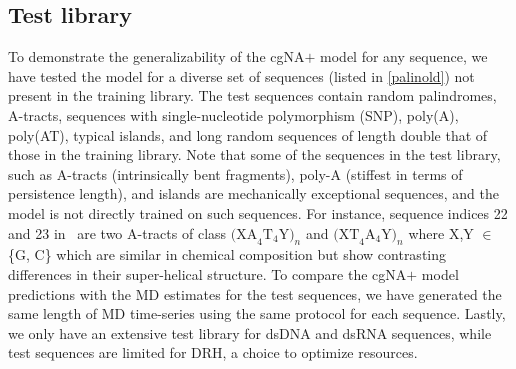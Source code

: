 \subsection{Test library}
To demonstrate the generalizability of the cgNA$+$ model for any sequence, we have tested the model for a diverse set of sequences (listed in \cref{palinold}) not present in the training library. 
The test sequences contain random palindromes, A-tracts, sequences with single-nucleotide polymorphism (SNP), poly(A), poly(AT), typical \cpg islands, and long random sequences of length double that of those in the training library.
Note that some of the sequences in the test library, such as A-tracts (intrinsically bent fragments), poly-A (stiffest in terms of persistence length), and \cpg islands are mechanically exceptional sequences, and the model is not directly trained on such sequences.
For instance, sequence indices 22 and 23 in \Lbdna \ are two A-tracts of class $\text{(XA}_4\text{T}_4\text{Y)}_n$ and $\text{(XT}_4\text{A}_4\text{Y)}_n$ where X,Y $\in$ \{G, C\} which are similar in chemical composition but show contrasting differences in their super-helical structure.
To compare the cgNA$+$ model predictions with the MD estimates for the test sequences, we have generated the same length of MD time-series using the same protocol for each sequence.
Lastly, we only have an extensive test library for dsDNA and dsRNA sequences, while test sequences are limited for DRH, a choice to optimize resources.
